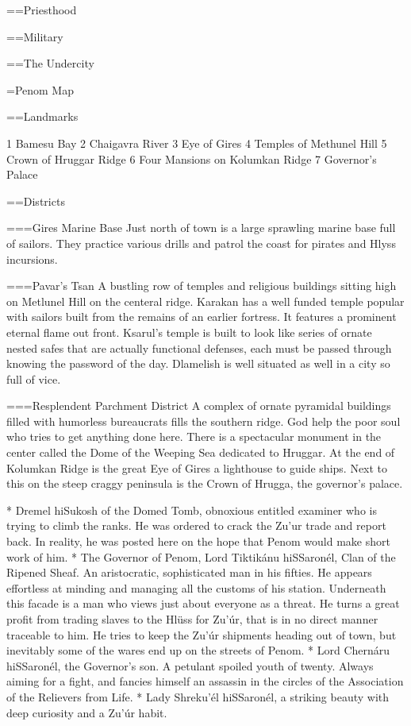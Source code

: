 ==Priesthood

==Military

==The Undercity

=Penom Map


==Landmarks

1 Bamesu Bay
2 Chaigavra River
3 Eye of Gires
4 Temples of Methunel Hill
5 Crown of Hruggar Ridge
6 Four Mansions on Kolumkan Ridge
7 Governor's Palace

==Districts

===Gires Marine Base
Just north of town is a large sprawling marine base full of sailors. They practice various drills and patrol the coast for pirates and Hlyss incursions.


===Pavar's Tsan
A bustling row of temples and religious buildings sitting high on Metlunel Hill on the centeral ridge. Karakan has a well funded temple popular with sailors built from the remains of an earlier fortress. It features a prominent eternal flame out front. Ksarul's temple is built to look like series of ornate nested safes that are actually functional defenses, each must be passed through knowing the password of the day. Dlamelish is well situated as well in a city so full of vice.

===Resplendent Parchment District
A complex of ornate pyramidal buildings filled with humorless bureaucrats fills the southern ridge. God help the poor soul who tries to get anything done here. There is a spectacular monument in the center called the Dome of the Weeping Sea dedicated to Hruggar. At the end of Kolumkan Ridge is the great Eye of Gires a lighthouse to guide ships. Next to this on the steep craggy peninsula is the Crown of Hrugga, the governor's palace.

* Dremel hiSukosh of the Domed Tomb, obnoxious entitled examiner who is trying to climb the ranks. He was ordered to crack the Zu'ur trade and report back. In reality, he was posted here on the hope that Penom would make short work of him.
* The Governor of Penom, Lord Tiktikánu hiSSaronél, Clan of the Ripened Sheaf. An aristocratic, sophisticated man in his fifties. He appears effortless at minding and managing all the customs of his station. Underneath this facade is a man who views just about everyone as a threat. He turns a great profit from trading slaves to the Hlüss for Zu'úr, that is in no direct manner traceable to him. He tries to keep the Zu'úr shipments heading out of town, but inevitably some of the wares end up on the streets of Penom.
* Lord Chernáru hiSSaronél, the Governor's son. A petulant spoiled youth of twenty. Always aiming for a fight, and fancies himself an assassin in the circles of the Association of the Relievers from Life.
* Lady Shreku'él hiSSaronél, a striking beauty with deep curiosity and a Zu'úr habit.

